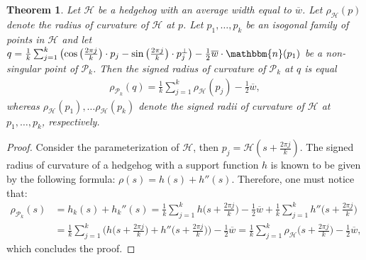 \documentclass{amsart}
\newtheorem{thm}{Theorem}[section]
\theoremstyle{definition}
\numberwithin{equation}{section}
\begin{document}
    \begin{thm}\label{Thmcurvature}
Let $\mathcal{H}$ be a hedgehog with an average width equal to $\overline{w}$. Let $\rho_{\mathcal{H}}(p)$ denote the radius of curvature of $\mathcal{H}$ at $p$. Let $p_1,\ldots, p_k$ be an isogonal family of points in $\mathcal{H}$ and let $q=\frac{1}{k}\sum_{j=1}^{k}\left(\cos\left(\frac{2\pi j}{k}\right)\cdot p_j-\sin\left(\frac{2\pi j}{k}\right)\cdot p_j^\perp \right) -\frac{1}{2}\overline{w}\cdot \mathbbm{n}(p_1)$ be a non-singular point of $\mathcal{P}_k$. Then the signed radius of curvature of $\mathcal{P}_k$ at $q$ is equal
\begin{align}\label{KappaCmws}
\rho_{\mathcal{P}_k}(q) = \frac{1}{k}\sum_{j=1}^{k} \rho_{\mathcal{H}}\left(p_j\right) - \frac{1}{2}\overline{w},
\end{align}
whereas $\rho_{\mathcal{H}}(p_1),\ldots \rho_{\mathcal{H}}(p_k)$ denote the signed radii of curvature of $\mathcal{H}$ at $p_1,\ldots, p_k$, respectively.


\end{thm}
\begin{proof}
Consider the parameterization of $\mathcal{H}$, then $p_j = \mathcal{H}\left(s+\frac{2\pi j}{k}\right)$. The signed radius of curvature of a hedgehog with a support function $h$ is known to be given by the following formula: $\rho(s)=h(s)+h''(s)$.  Therefore, one must notice that:
\begin{align*}
    \rho_{\mathcal{P}_k}(s) &= h_k(s) + h_k''(s)=\frac{1}{k}\sum_{j=1}^{k}h\Big(s+\frac{2\pi j}{k}\Big) - \frac{1}{2}\overline{w} +\frac{1}{k}\sum_{j=1}^{k}h''\Big(s+\frac{2\pi j}{k}\Big)\\&=\frac{1}{k}\sum_{j=1}^{k}\Bigg(h\Big(s+\frac{2\pi j}{k}\Big)+ h''\Big(s+\frac{2\pi j}{k}\Big)\Bigg) - \frac{1}{2}\overline{w}=\frac{1}{k}\sum_{j=1}^{k}\rho_{\mathcal{H}}\Big(s+\frac{2\pi j}{k}\Big)- \frac{1}{2}\overline{w},
\end{align*}
which concludes the proof.
\end{proof}
\end{document}
